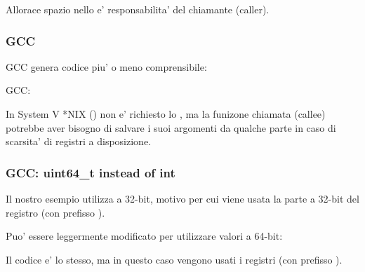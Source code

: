 Allorace spazio nello  e' responsabilita' del chiamante (\gls{caller}).

\subsubsection{GCC}

\Optimizing GCC genera codice piu' o meno comprensibile:



\NonOptimizing GCC:




In System V *NIX (\SysVABI) non e' richiesto lo , ma la funizone chiamata (\gls{callee}) potrebbe aver bisogno di salvare
i suoi argomenti da qualche parte in caso di scarsita' di registri a disposizione.

\subsubsection{GCC: uint64\_t instead of int}

Il nostro esempio utilizza \Tint a 32-bit, motivo per cui viene usata la parte a 32-bit del registro (con prefisso ).

Puo' essere leggermente modificato per utilizzare valori a 64-bit:





Il codice e' lo stesso, ma in questo caso vengono usati i registri  (con prefisso ).
